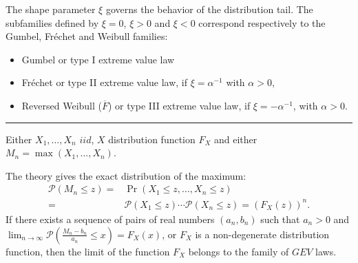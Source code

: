 \begin{f}
\end{f}

\begin{f}

The shape parameter \(\xi\) governs the behavior of the distribution tail.
The subfamilies defined by \(\xi= 0\), \(\xi>0\) and \(\xi<0\) correspond respectively to the Gumbel, Fréchet and Weibull families:
\begin{itemize}
\item 	 Gumbel or type I extreme value law
\item     Fréchet or type II extreme value law, if \(\xi  = \alpha^{-1}\) with \(\alpha>0\),
\item    Reversed Weibull (\(\overline{F}\)) or type III extreme value law, if \(\xi =-\alpha^{-1} \), with \(\alpha>0\).
\end{itemize}
\end{f}
\hrule 

\begin{f} 

	Either \(X_1, \dots, X_n\)  \(iid\), \(X\) distribution function \(F_X\) and either \(M_n =\max(X_1,\dots,X_n)\).
	
	The theory gives the exact distribution of the maximum:
\begin{align*}
		\mathcal{P}(M_n \leq z) = &\Pr(X_1 \leq z, \dots, X_n \leq z) \\
		 = &\mathcal{P}(X_1 \leq z) \cdots \mathcal{P}(X_n \leq z) = (F_X(z))^n. 
\end{align*}
	If there exists a sequence of pairs of real numbers \((a_n, b_n)\) such that \(a_n>0\) and \(\lim_{n \to \infty}\mathcal{P}\left(\frac{M_n-b_n}{a_n}\leq x\right) = F_X(x)\), or \(F_X\) is a non-degenerate distribution function, then the limit of the function \(F_X\) belongs to the family of \(GEV\) laws. 

\end{f}

